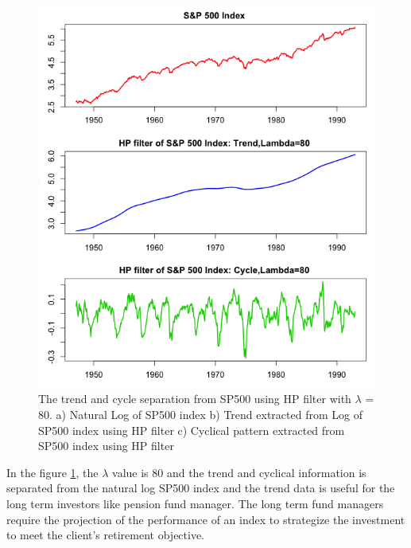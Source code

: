 \begin{figure}[!ht]
\centering
\includegraphics[scale=.65]{Images/SP500HP80}
\caption{The trend and cycle separation from SP500 using HP filter with $\lambda$ = 80. a) Natural Log of SP500 index b) Trend extracted from Log of SP500 index using HP filter c) Cyclical pattern extracted from SP500 index using HP filter}
\label{fig:SP500HP80}
\end{figure}

In the figure \ref{fig:SP500HP80}, the $\lambda$ value is 80 and the trend and cyclical information is separated from the natural log SP500 index and the trend data is useful for the long term investors like pension fund manager. The long term fund managers require the projection of the performance of an index to strategize the investment to meet the client's retirement objective. 

